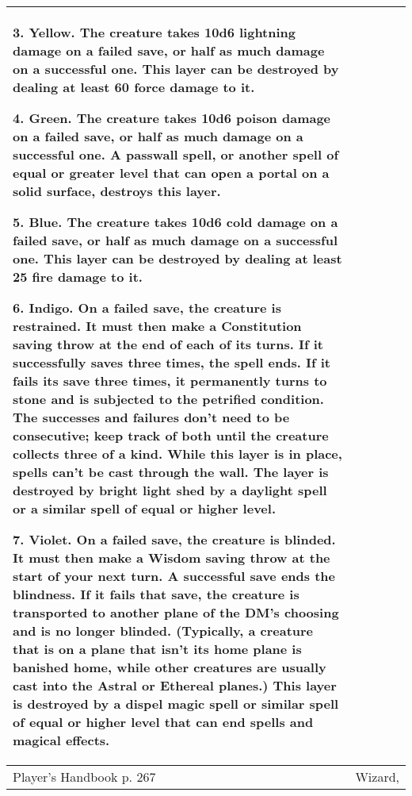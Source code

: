 \documentclass[11pt]{report}
\begin{document}
\begin{table}[H]
\begin{tabular}{||p{6cm}|p{6cm}||}
{3. Yellow. The creature takes 10d6 lightning damage on a failed save, or half as much damage on a successful one. This layer can be destroyed by dealing at least 60 force damage to it.

4. Green. The creature takes 10d6 poison damage on a failed save, or half as much damage on a successful one. A passwall spell, or another spell of equal or greater level that can open a portal on a solid surface, destroys this layer.

5. Blue. The creature takes 10d6 cold damage on a failed save, or half as much damage on a successful one. This layer can be destroyed by dealing at least 25 fire damage to it.

6. Indigo. On a failed save, the creature is restrained. It must then make a Constitution saving throw at the end of each of its turns. If it successfully saves three times, the spell ends. If it fails its save three times, it permanently turns to stone and is subjected to the petrified condition. The successes and failures don’t need to be consecutive; keep track of both until the creature collects three of a kind. While this layer is in place, spells can’t be cast through the wall. The layer is destroyed by bright light shed by a daylight spell or a similar spell of equal or higher level.

7. Violet. On a failed save, the creature is blinded. It must then make a Wisdom saving throw at the start of your next turn. A successful save ends the blindness. If it fails that save, the creature is transported to another plane of the DM’s choosing and is no longer blinded. (Typically, a creature that is on a plane that isn’t its home plane is banished home, while other creatures are usually cast into the Astral or Ethereal planes.) This layer is destroyed by a dispel magic spell or similar spell of equal or higher level that can end spells and magical effects.}\\ \hline
Player's Handbook p. 267 & Wizard, \\ \hline\hline
	\end{tabular}
\end{table}
\end{document}
